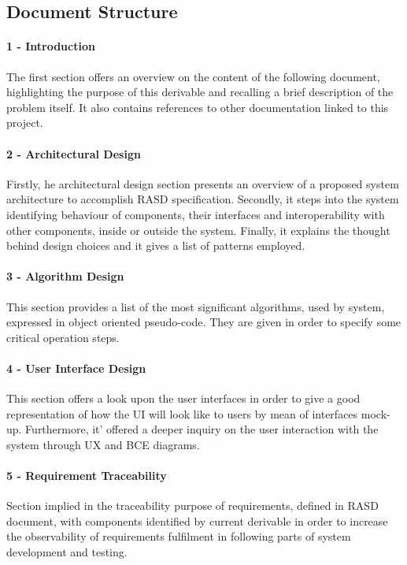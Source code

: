\subsection{Document Structure}



	\paragraph*{1 - Introduction} 
	The first section offers an overview on the content of the following document, highlighting the purpose of this derivable and recalling a brief description of the problem itself. It also contains references to other documentation linked to this project.

	\paragraph*{2 - Architectural Design} 
	Firstly, he architectural design section presents an overview of a proposed system architecture to accomplish RASD specification. 
	\newline
	Secondly, it steps into the system identifying behaviour of components, their interfaces and interoperability with other components, inside or outside the system. 
	\newline
	Finally, it explains the thought behind design choices and it gives a list of patterns employed.

	\paragraph*{3 - Algorithm Design}
	This section provides a list of the most significant algorithms, used by system, expressed in object oriented pseudo-code. They are given in order to specify some critical operation steps.

	\paragraph*{4 - User Interface Design}
	This section offers a look upon the user interfaces in order to give a good representation of how the UI will look like to users by mean of interfaces mock-up. Furthermore, it' offered a deeper inquiry on the user interaction with the system through UX and BCE diagrams.

	\paragraph*{5 - Requirement Traceability}
	Section implied in the traceability purpose of requirements, defined in RASD document, with components identified by current derivable in order to increase the observability of requirements fulfilment in following parts of system development and testing.

